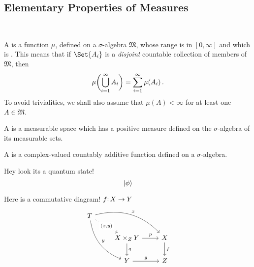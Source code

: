 \documentclass[12pt, ThmSectionNumbering]{CrispyNotes}
\begin{document}
\subsection{Elementary Properties of Measures}
\begin{definition}~
    \begin{thmitems}
        \item
            A  is a function $\mu$, defined on a $\sigma$-algebra $\mathfrak{M}$, whose range is in $[0, \infty]$ and which is . This means that if $\Set{A_i}$ is a \emph{disjoint} countable collection of members of $\mathfrak{M}$, then
                \begin{equation}\label{d4}
                    \mu\biggl(\bigcup_{i=1}^\infty A_i\biggr) = \sum_{i=1}^\infty \mu(A_i)\mathclose{\,\text{.}}
                \end{equation}
            To avoid trivialities, we shall also assume that $\mu(A)<\infty$ for at least one $A\in\mathfrak{M}$.

        \item
            A  is a measurable space which has a positive measure defined on the $\sigma$-algebra of its measurable sets.

        \item
            A  is a complex-valued countably additive function defined on a $\sigma$-algebra.
  \end{thmitems}
\end{definition}

Hey look its a quantum state! 
    \begin{equation*}
      \lvert\phi\rangle
    \end{equation*}

Here is a commutative diagram! \(f\mathpunct{:} X \to Y\)
        \begin{equation*}
        \begin{tikzcd}
            T
            \arrow[drr, bend left, "x"]
            \arrow[ddr, bend right, "y"]
            \arrow[dr, dotted, "{(x,y)}" description] & & \\
                & X \times_Z Y \arrow[r, "p"] \arrow[d, "q"]
                & X \arrow[d, "f"] \\
                & Y \arrow[r, "g"]
                & Z
        \end{tikzcd}
        \end{equation*}

\pagebreak
\hypertarget{bm:References}{}
\printbibliography
\end{document}

